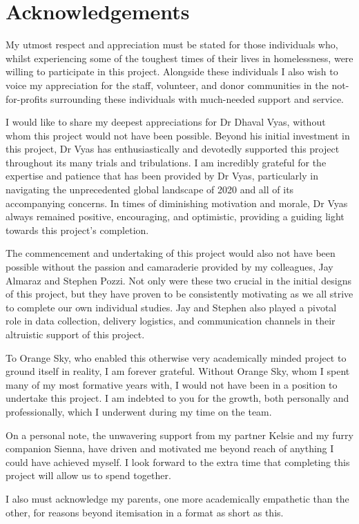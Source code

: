 \chapter{Acknowledgements}

My utmost respect and appreciation must be stated for those individuals who, whilst experiencing some of the toughest times of their lives in homelessness, were willing to participate in this project. Alongside these individuals I also wish to voice my appreciation for the staff, volunteer, and donor communities in the not-for-profits surrounding these individuals with much-needed support and service.

I would like to share my deepest appreciations for Dr Dhaval Vyas, without whom this project would not have been possible. Beyond his initial investment in this project, Dr Vyas has enthusiastically and devotedly supported this project throughout its many trials and tribulations. I am incredibly grateful for the expertise and patience that has been provided by Dr Vyas, particularly in navigating the unprecedented global landscape of 2020 and all of its accompanying concerns. In times of diminishing motivation and morale, Dr Vyas always remained positive, encouraging, and optimistic, providing a guiding light towards this project's completion.

The commencement and undertaking of this project would also not have been possible without the passion and camaraderie provided by my colleagues, Jay Almaraz and Stephen Pozzi. Not only were these two crucial in the initial designs of this project, but they have proven to be consistently motivating as we all strive to complete our own individual studies. Jay and Stephen also played a pivotal role in data collection, delivery logistics, and communication channels in their altruistic support of this project.

To Orange Sky, who enabled this otherwise very academically minded project to ground itself in reality, I am forever grateful. Without Orange Sky, whom I spent many of my most formative years with, I would not have been in a position to undertake this project. I am indebted to you for the growth, both personally and professionally, which I underwent during my time on the team.

On a personal note, the unwavering support from my partner Kelsie and my furry companion Sienna, have driven and motivated me beyond reach of anything I could have achieved myself. I look forward to the extra time that completing this project will allow us to spend together.

I also must acknowledge my parents, one more academically empathetic than the other, for reasons beyond itemisation in a format as short as this. 

\cleardoublepage